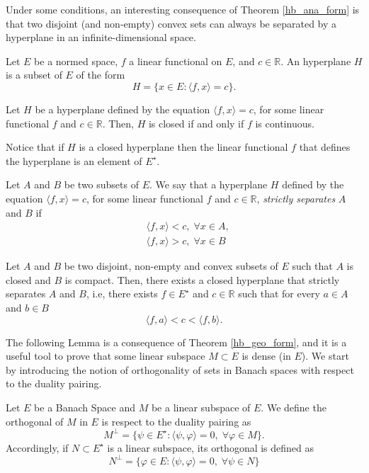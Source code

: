 Under some conditions, an interesting consequence of Theorem \eqref{hb_ana_form} is that two disjoint (and non-empty) convex sets can always be separated by a hyperplane in an infinite-dimensional space.
\begin{definition}
    Let \(E\) be a normed space, \(f\) a linear functional on \(E\), and \(c \in \mathbb{R}\). An hyperplane \(H\) is a subset of \(E\) of the form
    \[
        H = \{x \in E: \langle f, x \rangle = c\}.
    \]
\end{definition}
\begin{proposition}
    Let \(H\) be a hyperplane defined by the equation \(\langle f, x \rangle = c\), for some linear functional \(f\) and \(c \in \mathbb{R}\). Then, \(H\) is closed if and only if \(f\) is continuous.
\end{proposition}
Notice that if \(H\) is a closed hyperplane then the linear functional \(f\) that defines the hyperplane is an element of \(E^\star\).
\begin{definition}
    Let \(A\) and \(B\) be two subsets of \(E\). We say that a hyperplane \(H\) defined by the equation \(\langle f, x \rangle = c\), for some linear functional \(f\) and \(c \in \mathbb{R}\), \textit{strictly separates} \(A\) and \(B\) if
    \begin{align*}
        &\langle f, x \rangle < c, \; \forall x \in A,\\
        & \langle f, x \rangle > c, \; \forall x \in B
    \end{align*}
\end{definition}
\begin{theorem}\label{hb_geo_form}
    Let \(A\) and \(B\) be two disjoint, non-empty and convex subsets of \(E\) such that \(A\) is closed and \(B\) is compact. Then, there exists a closed hyperplane that strictly separates \(A\) and \(B\), i.e, there exists \(f \in E^\star\) and \(c \in \mathbb{R}\) such that for every \(a \in A\) and \(b \in B\)
    \[
        \langle f, a \rangle < c < \langle f, b \rangle.
    \]
\end{theorem}
The following Lemma is a consequence of Theorem \eqref{hb_geo_form}, and it is a useful tool to prove that some linear subspace \(M \subset E\) is dense (in \(E\)). We start by introducing the notion of orthogonality of sets in Banach spaces with respect to the duality pairing.
\begin{definition}\label{banach_ortho_def}
    Let \(E\) be a Banach Space and \(M\) be a linear subspace of \(E\). We define the orthogonal of \(M\) in \(E\) is respect to the duality pairing as
    \[
        M^\perp = \{\psi \in E^\star: \langle \psi, \varphi \rangle = 0, \; \forall \varphi \in M\}.
    \]
    Accordingly, if \(N \subset E^\star\) is a linear subspace, its orthogonal is defined as 
    \[
        N^\perp = \{\varphi \in E: \langle \psi, \varphi \rangle = 0, \; \forall \psi \in N\}
    \]
\end{definition}
